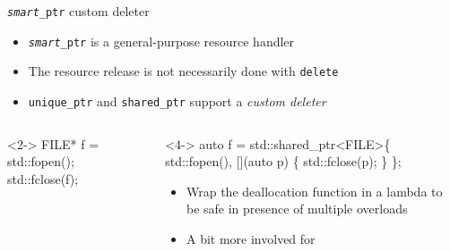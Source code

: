 \begin{frame}[fragile]{\texttt{\textit{smart}\_ptr} custom deleter}
  \begin{itemize}
  \item \texttt{\textit{smart}\_ptr} is a general-purpose resource handler
  \item The resource release is not necessarily done with \texttt{delete}
  \item \texttt{unique\_ptr} and \texttt{shared\_ptr} support a
    \textit{custom deleter}
  \end{itemize}
  \begin{columns}[t]
    \begin{column}{.5\textwidth}
      \begin{codeblock}<2->{
FILE* f = std::fopen(\ddd);
\ddd
std::fclose(f);}\end{codeblock}


    \end{column}

    \begin{column}{.5\textwidth}
      \begin{codeblock}<4->{
auto f = std::shared\_ptr<FILE>\{
  std::fopen(\ddd),
  [](auto p) \{ std::fclose(p); \}
\};}\end{codeblock}

      \begin{itemize}
      \item<5-> Wrap the deallocation function in a lambda to be safe in presence of
        multiple overloads
      \item<6-> A bit more involved for 
      \end{itemize}
    \end{column}

  \end{columns}
\end{frame}

